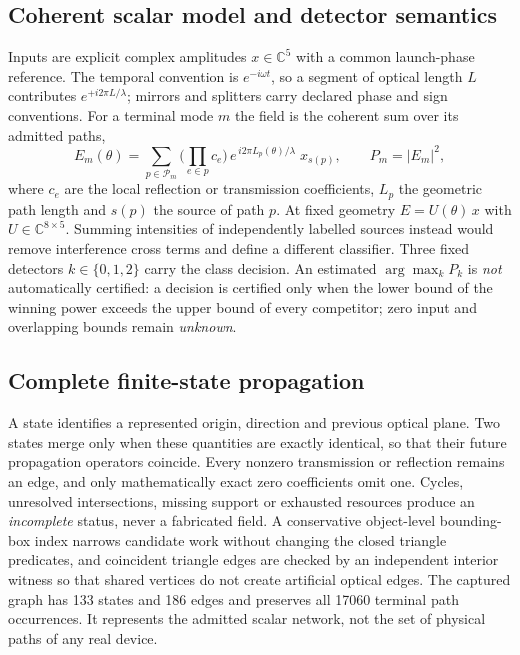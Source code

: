 \documentclass[11pt,a4paper]{article}
\begin{document}
\subsection{Coherent scalar model and detector semantics}
Inputs are explicit complex amplitudes $x \in \mathbb{C}^5$ with a common launch-phase reference. The temporal convention is $e^{-i\omega t}$, so a segment of optical length $L$ contributes $e^{+i 2\pi L/\lambda}$; mirrors and splitters carry declared phase and sign conventions. For a terminal mode $m$ the field is the coherent sum over its admitted paths,
\begin{equation}
  E_m(\theta) = \sum_{p \in \mathcal{P}_m} \Big(\prod_{e \in p} c_e\Big)\, e^{\,i 2\pi L_p(\theta)/\lambda}\; x_{s(p)},
  \qquad P_m = |E_m|^2,
  \label{eq:field}
\end{equation}
where $c_e$ are the local reflection or transmission coefficients, $L_p$ the geometric path length and $s(p)$ the source of path $p$. At fixed geometry $E = U(\theta)\,x$ with $U \in \mathbb{C}^{8\times5}$. Summing intensities of independently labelled sources instead would remove interference cross terms and define a different classifier. Three fixed detectors $k \in \{0,1,2\}$ carry the class decision. An estimated $\arg\max_k P_k$ is \emph{not} automatically certified: a decision is certified only when the lower bound of the winning power exceeds the upper bound of every competitor; zero input and overlapping bounds remain \emph{unknown}.

\subsection{Complete finite-state propagation}
A state identifies a represented origin, direction and previous optical plane. Two states merge only when these quantities are exactly identical, so that their future propagation operators coincide. Every nonzero transmission or reflection remains an edge, and only mathematically exact zero coefficients omit one. Cycles, unresolved intersections, missing support or exhausted resources produce an \emph{incomplete} status, never a fabricated field. A conservative object-level bounding-box index narrows candidate work without changing the closed triangle predicates, and coincident triangle edges are checked by an independent interior witness so that shared vertices do not create artificial optical edges. The captured graph has 133 states and 186 edges and preserves all \num{17060} terminal path occurrences. It represents the admitted scalar network, not the set of physical paths of any real device.
\end{document}
